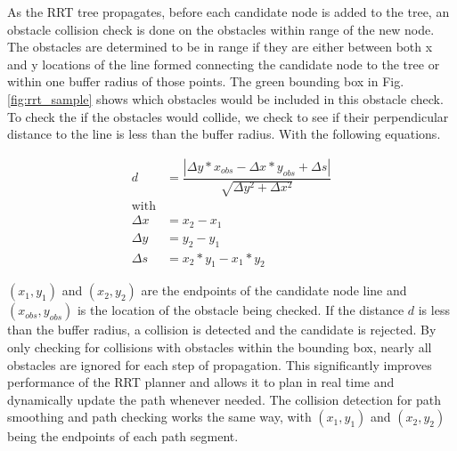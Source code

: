 \documentclass[letterpaper, 10 pt, conference]{ieeeconf}  %
\newcommand{\todo}[1]{{\color{blue}[TODO: #1]}}
\begin{document}
As the RRT tree propagates, before each candidate node is added to the tree, an obstacle collision check is done on the obstacles within range of the new node. The obstacles are determined to be in range if they are either between both x and y locations of the line formed connecting the candidate node to the tree or within one buffer radius of those points. The green bounding box in Fig. \ref{fig:rrt_sample} shows which obstacles would be included in this obstacle check. To check the if the obstacles would collide, we check to see if their perpendicular distance to the line is less than the buffer radius. With the following equations.

\begin{align}
  d &= \dfrac{|\Delta y*x_{\mathit{obs}} -
      \Delta x*y_{\mathit{obs}} + \Delta s|}
      {\sqrt{\Delta y^2 + \Delta x^2}}\\
  \nonumber \text{with}\\
  \Delta x &= x_2 - x_1\\
  \Delta y &= y_2 - y_1\\
  \Delta s &= x_2*y_1 -x_1*y_2
\end{align}

$(x_1,y_1)$ and $(x_2,y_2)$ are the endpoints of the candidate node line and $(x_{\mathit{obs}},y_{\mathit{obs}})$ is the location of the obstacle being checked. If the distance $d$ is less than the buffer radius, a collision is detected and the candidate is rejected. By only checking for collisions with obstacles within the bounding box, nearly all obstacles are ignored for each step of propagation. This significantly improves performance of the RRT planner and allows it to plan in real time and dynamically update the path whenever needed. The collision detection for path smoothing and path checking works the same way, with $(x_1,y_1)$ and $(x_2,y_2)$ being the endpoints of each path segment.

%
%
%
%
\end{document}

